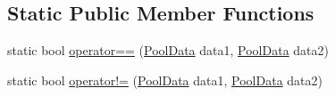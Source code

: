 \subsection*{Static Public Member Functions}
\begin{DoxyCompactItemize}
\item 
static bool \hyperlink{class_hostile_1_1_simple_pool_1_1_simple_pool_1_1_pool_data_a9727c6c6a5cbf285ceefcd313abd562f}{operator==} (\hyperlink{class_hostile_1_1_simple_pool_1_1_simple_pool_1_1_pool_data}{Pool\-Data} data1, \hyperlink{class_hostile_1_1_simple_pool_1_1_simple_pool_1_1_pool_data}{Pool\-Data} data2)
\item 
static bool \hyperlink{class_hostile_1_1_simple_pool_1_1_simple_pool_1_1_pool_data_a3e8985baca762d6295fe20d3dab387e4}{operator!=} (\hyperlink{class_hostile_1_1_simple_pool_1_1_simple_pool_1_1_pool_data}{Pool\-Data} data1, \hyperlink{class_hostile_1_1_simple_pool_1_1_simple_pool_1_1_pool_data}{Pool\-Data} data2)
\end{DoxyCompactItemize}
